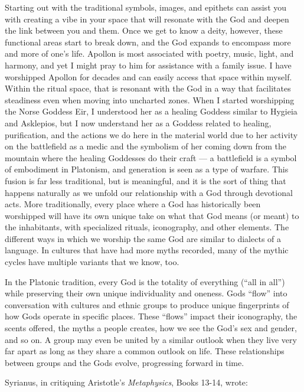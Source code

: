 \documentclass[
]{book}
\begin{document}
Starting out with the traditional symbols, images, and epithets can assist you with creating a vibe in your space that will resonate with the God and deepen the link between you and them. Once we get to know a deity, however, these functional areas start to break down, and the God expands to encompass more and more of one's life. Apollon is most associated with poetry, music, light, and harmony, and yet I might pray to him for assistance with a family issue. I have worshipped Apollon for decades and can easily access that space within myself. Within the ritual space, that is resonant with the God in a way that facilitates steadiness even when moving into uncharted zones. When I started worshipping the Norse Goddess Eir, I understood her as a healing Goddess similar to Hygieia and Asklepios, but I now understand her as a Goddess related to healing, purification, and the actions we do here in the material world due to her activity on the battlefield as a medic and the symbolism of her coming down from the mountain where the healing Goddesses do their craft --- a battlefield is a symbol of embodiment in Platonism, and generation is seen as a type of warfare. This fusion is far less traditional, but is meaningful, and it is the sort of thing that happens naturally as we unfold our relationship with a God through devotional acts. More traditionally, every place where a God has historically been worshipped will have its own unique take on what that God means (or meant) to the inhabitants, with specialized rituals, iconography, and other elements. The different ways in which we worship the same God are similar to dialects of a language. In cultures that have had more myths recorded, many of the mythic cycles have multiple variants that we know, too.

In the Platonic tradition, every God is the totality of everything (``all in all'') while preserving their own unique individuality and oneness. Gods ``flow'' into conversation with cultures and ethnic groups to produce unique fingerprints of how Gods operate in specific places. These ``flows'' impact their iconography, the scents offered, the myths a people creates, how we see the God's sex and gender, and so on. A group may even be united by a similar outlook when they live very far apart as long as they share a common outlook on life. These relationships between groups and the Gods evolve, progressing forward in time.

Syrianus, in critiquing Aristotle's \emph{Metaphysics}, Books 13-14, wrote:
\end{document}
